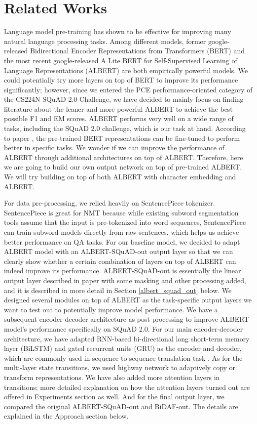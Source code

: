 \documentclass{article}
\begin{document}
\section{Related Works}
Language model pre-training has shown to be effective for improving many natural language processing tasks. Among different models, former google-released Bidirectional Encoder Representations from Transformers (BERT) \citep{bert} and the most recent google-released A Lite BERT for Self-Supervised Learning of Language Representations (ALBERT) \citep{albert_orig} are both empirically powerful models. We could potentially try more layers on top of BERT to improve its performance significantly; however, since we entered the PCE performance-oriented category of the CS224N SQuAD 2.0 Challenge, we have decided to mainly focus on finding literature about the leaner and more powerful ALBERT to achieve the best possible F1 and EM scores. ALBERT performs very well on a wide range of tasks, including the SQuAD 2.0 challenge, which is our task at hand. According to paper \citep{bert}, the pre-trained BERT representations can be fine-tuned to perform better in specific tasks. We wonder if we can improve the performance of ALBERT through additional architectures on top of ALBERT. Therefore, here we are going to build our own output network on top of pre-trained ALBERT. We will try building on top of both ALBERT with character embedding and ALBERT.

For data pre-processing, we relied heavily on SentencePiece tokenizer. SentencePiece is great for NMT because while existing subword segmentation tools assume that the input is pre-tokenized into word sequences, SentencePiece can train subword models directly from raw sentences, which helps us achieve better performance on QA tasks. \citep{sent_piece} For our baseline model, we decided to adapt ALBERT model with an ALBERT-SQuAD-out output layer so that we can clearly show whether a certain combination of layers on top of ALBERT can indeed improve its performance. ALBERT-SQuAD-out is essentially the linear output layer described in paper \citep{albert_orig} with some masking and other processing added, and it is described in more detail in Section \ref{albert_squad_out} below. We designed several modules on top of ALBERT as the task-specific output layers we want to test out to potentially improve model performance. We have a subsequent encoder-decoder architecture as post-processing to improve ALBERT model’s performance specifically on SQuAD 2.0. For our main encoder-decoder architecture, we have adapted RNN-based bi-directional long short-term memory layer (BiLSTM) \citep{lstm} and gated recurrent units (GRU) \citep{gru} as the encoder and decoder, which are commonly used in sequence to sequence translation task \citep{seq_to_seq}. As for the multi-layer state transitions, we used highway network \citep{highway} to adaptively copy or transform representations. We have also added more attention layers in transitions; more detailed explanation on how the attention layers turned out are offered in Experiments section as well. And for the final output layer, we compared the original ALBERT-SQuAD-out and BiDAF-out. The details are explained in the Approach section below.
\end{document}
